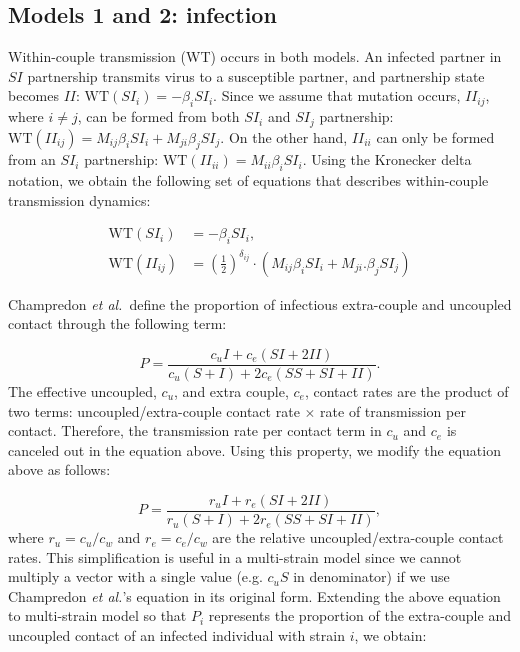 \documentclass[10pt,letterpaper]{article}
\newcommand{\khalf}{\left(\frac{1}{2}\right)^{\delta_{ij}}}  %
\newcommand{\etal}{\textit{et al.}}
\newcommand{\WT}{\textrm{WT}}
\begin{document}
\subsection*{Models 1 and 2: infection}

Within-couple transmission (WT) occurs in both models. An infected partner in $SI$ partnership transmits virus to a susceptible partner, and partnership state becomes $II$: $\WT(SI_i) = - \beta_i SI_i$. Since we assume that mutation occurs, $II_{ij}$, where $i \neq j$, can be formed from both $SI_i$ and $SI_j$ partnership: $\WT(II_{ij}) = M_{ij} \beta_i SI_i + M_{ji} \beta_j SI_j$. On the other hand, $II_{ii}$ can only be formed from an $SI_i$ partnership: $\WT(II_{ii}) = M_{ii} \beta_i SI_i$. Using the Kronecker delta notation, we obtain the following set of equations that describes within-couple transmission dynamics:

\begin{equation}
\begin{aligned}
\WT(SI_i) &= - \beta_i SI_i,\\
\WT(II_{ij}) &=  \khalf \cdot (M_{ij} \beta_i SI_i + M_{ji}. \beta_j SI_j)
\end{aligned}
\end{equation}

Champredon \etal\ define the proportion of infectious extra-couple and uncoupled contact through the following term:

\begin{equation}
P = \frac{c_u I + c_e (SI + 2 II)}{c_u (S + I) + 2 c_e(SS + SI + II)}.
\end{equation}
The effective uncoupled, $c_u$, and extra couple, $c_e$, contact rates are the product of two terms: uncoupled/extra-couple contact rate $\times$ rate of transmission per contact. Therefore, the transmission rate per contact term in $c_u$ and $c_e$ is canceled out in the equation above. Using this property, we modify the equation above as follows:

\begin{equation}
P = \frac{r_u I + r_e (SI + 2 II)}{r_u (S + I) + 2 r_e(SS + SI + II)},
\end{equation}
where $r_u = c_u/c_w$ and $r_e = c_e/c_w$ are the relative uncoupled/extra-couple contact rates. This simplification is useful in a multi-strain model since we cannot multiply a vector with a single value (e.g. $c_u S$ in denominator) if we use Champredon \etal's equation in its original form. Extending the above equation to multi-strain model so that $P_i$ represents the proportion of the extra-couple and uncoupled contact of an infected individual with strain $i$, we obtain:
\end{document}
